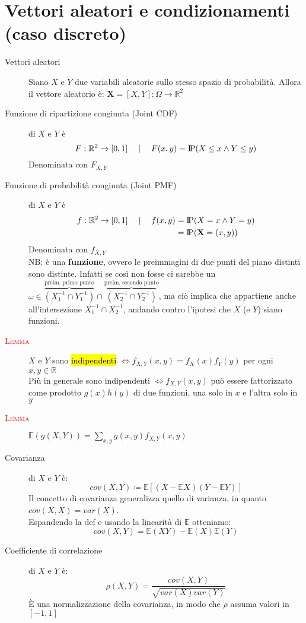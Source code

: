 \documentclass[a4paper,10pt]{article}
\newcommand{\bvec}{\textbf} %
\newcommand{\myth}{\normalfont \scshape \textcolor{red}} %
\newcommand{\re}{\mathbb{R}} %
\newcommand{\pr}{\text{I\kern-0.15em P}} %
\newcommand{\ex}{\mathbb{E}} %
\newcommand{\om}{\Omega} %
\theoremstyle{remark}
\theoremstyle{definition}
\begin{document}
\section*{Vettori aleatori e condizionamenti (caso discreto)}
\begin{description}
\item[Vettori aleatori] Siano $X$ e $Y$ due variabili aleatorie sullo stesso spazio di probabilità. Allora il vettore aleatorio è: $\bvec{X}=[X,Y]: \om \to \mathbb{R}^2$ 

\item[Funzione di ripartizione congiunta (Joint CDF)] di $X$ e $Y$ è $$F:\re^2\to[0,1] \quad \mid  \quad F(x,y)=\pr(X\le x \wedge Y\le y)$$
Denominata con $F_{X,Y}$

\item[Funzione di probabilità congiunta (Joint PMF)] di $X$ e $Y$ è 
\begin{align*}
    f:\re^2\to[0,1] \quad \mid  \quad f(x,y)&=\pr(X= x \wedge Y= y) \\
&=\pr(\bvec{X}=(x,y))
\end{align*}
Denominata con $f_{X,Y}$ \\
NB: è una \textbf{funzione}, ovvero le preimmagini di due punti del piano distinti sono distinte. Infatti se così  non fosse ci sarebbe un $\omega \in \overbrace{(X^{-1}_1 \cap Y^{-1}_1)}^{\text{preim. primo punto}}\cap \overbrace{(X^{-1}_2 \cap Y^{-1}_2)}^{\text{preim. secondo punto}}$, ma ciò implica che appartiene anche all'intersezione $X^{-1}_1 \cap X^{-1}_2$, andando contro l'ipotesi che $X$ (e $Y$) siano funzioni.

\item[\myth{Lemma}]  $X$ e $Y$ sono \hl{indipendenti} $\iff f_{X,Y}(x,y)=f_{X}(x)f_{Y}(y)$ per ogni $x,y\in\re$ \\
Più in generale sono indipendenti $\iff f_{X,Y}(x,y)$ può essere fattorizzato come prodotto $g(x)h(y)$ di due funzioni, una solo in $x$ e l'altra solo in $y$

\item[\myth{Lemma}] $\ex(g(X,Y))=\sum_{x,y}g(x,y)f_{X,Y}(x,y)$

\item[Covarianza] di $X$ e $Y$ è:
$$cov(X,Y)\coloneqq\ex[(X-\ex X)(Y-\ex Y)]$$
Il concetto di covarianza generalizza quello di varianza, in quanto $cov(X,X)=var(X)$.\\
Espandendo la def e usando la linearità di $\ex$ otteniamo:
$$cov(X,Y)= \ex(XY)-\ex(X)\ex(Y)$$

\item[Coefficiente di correlazione] di $X$ e $Y$ è:
$$\rho(X,Y)=\frac{cov(X,Y)}{\sqrt{var(X)var(Y)}}$$
È una normalizzazione della covarianza, in modo che $\rho$ assuma valori in $[-1,1]$


\end{description}
\end{document}

